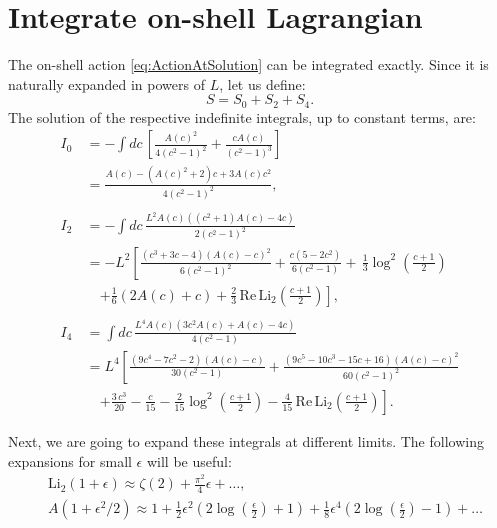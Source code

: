 \section{Integrate on-shell Lagrangian}\label{sec:integrate-action}

The on-shell action \eqref{eq:ActionAtSolution} can be integrated exactly. 
Since it is naturally expanded in powers of $L$, let us define:
\begin{equation}
 S = S_0 + S_2 + S_4.
\end{equation}
The solution of the respective indefinite integrals, up to constant terms, are:
\begin{align}
 I_0 &= - \int dc \,\left[ \frac{A(c)^2}{4 \left(c^2-1\right)^2}+\frac{c A(c)}{\left(c^2-1\right)^3} \right] \nonumber\\
     &=\frac{A(c)-\left(A(c)^2+2\right) c+3 A(c) c^2}{4 \left(c^2-1\right)^2},\label{eq:I0}\\
    \quad\nonumber\\
%     
I_2 &= - \int dc \, \frac{L^2 A(c) \left(\left(c^2+1\right) A(c)-4 c\right)}{2 \left(c^2-1\right)^2}\nonumber\\
    &=-L^2 \left[\frac{\left(c^3+3 c-4\right) (A(c)-c)^2}{6 \left(c^2-1\right)^2} 
      +\frac{c \left(5-2 c^2\right)}{6 \left(c^2-1\right)} + \, \frac{1}{3} \log^2\left(\frac{c+1}{2}\right)\right.\nonumber\\   
 & \quad \left. +\frac{1}{6} \left(2 A(c)+ c\right)
   + \frac{2}{3}  \, \text{Re} \, \text{Li}_2\left(\frac{c+1}{2}\right)\right],\label{eq:I0}\\
   \quad\nonumber\\
%    
 I_4 &=  \int dc\, \frac{L^4 A(c) \left(3 c^2 A(c)+A(c)-4 c\right)}{4 \left(c^2-1\right)} \nonumber\\
 &= L^4 \left[\frac{\left(9 c^4-7 c^2-2\right) (A(c)-c)}{30 \left(c^2-1\right)}+\frac{\left(9 c^5-10 c^3-15 c+16\right) (A(c)-c)^2}{60 \left(c^2-1\right)^2}\right.\nonumber\\
 & \quad \left. + \frac{3 \, c^3}{20}-\frac{c}{15} -\frac{2}{15} \log ^2\left(\frac{c+1}{2}\right) - \frac{4}{15}\, \text{Re} \, \text{Li}_2\left(\frac{c+1}{2}\right) \right]. \label{eq:I0}
\end{align}

Next, we are going to expand these integrals at different limits. The following expansions for small $\epsilon$ will be useful:
\begin{align}
& \text{Li}_2\left(1 + \epsilon \right) \approx  \zeta(2) + \frac{\pi^2}{4} \epsilon + \ldots,\\
& A(1+\epsilon^2/2)\approx 1+\frac{1}{2} \epsilon^2 \left(2 \log \left(\frac{\epsilon}{2}\right)+1\right) 
+ \frac{1}{8} \epsilon^4 \left(2 \log \left(\frac{\epsilon}{2}\right)-1\right)+ \ldots \label{eq:expandA}
\end{align}

